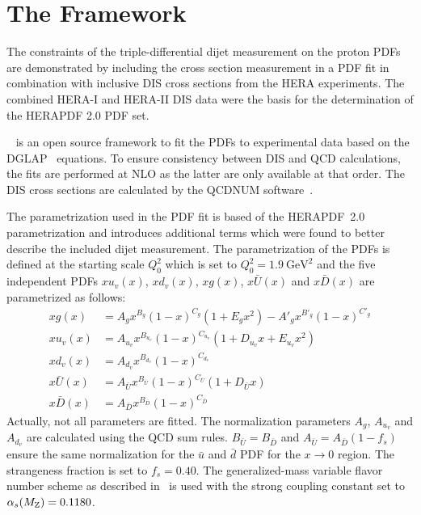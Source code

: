 \section{The \xfitter Framework}
\label{section:herafittersetup}

The constraints of the triple-differential dijet measurement on the proton PDFs
are demonstrated by including the cross section measurement in a PDF fit in
combination with inclusive DIS cross sections from the HERA experiments. The
combined HERA-I and HERA-II DIS data were the
basis for the determination of the HERAPDF 2.0 PDF set.

\xfitter~\cite{Alekhin:2014irh} is an open source framework to fit the PDFs to experimental data based
on the DGLAP~\cite{Gribov:1972ri,Altarelli:1977zs,Dokshitzer:1977sg} equations.
To ensure consistency between DIS and QCD calculations, the fits are performed
at NLO as the latter are only available at that order. The DIS cross sections
are calculated by the QCDNUM software~\cite{Botje:2010ay}.

The parametrization used in the PDF fit is based of the
HERAPDF~2.0~\cite{Abramowicz:2015mha} parametrization and introduces additional
terms which were found to better describe the included dijet
measurement. The parametrization of the PDFs is defined at the starting scale
$Q_0^2$
which is set to $Q_0^2 = \SI{1.9}{\GeV \squared}$ and the five independent PDFs
$xu_v(x)$, $xd_v(x)$, $xg(x)$, $x\bar{U}(x)$ and $x\bar{D}(x)$ are parametrized
as follows:
%
\begin{align*}
  xg(x) &= A_g x^{B_g} (1-x)^{C_g} (1 + E_g x^2) - A'_g x^{B'_g} (1-x)^{C'_g} \\
  xu_v(x) &= A_{u_{v}} x^{B_{u_{v}}} (1-x)^{C_{u_{v}}}(1 + D_{u_{v}}x + E_{u_{v}}x^2)\\
  xd_v(x) &= A_{d_v} x^{B_{d_v}} (1-x)^{C_{d_{v}}}\\
  x\bar U(x) &= A_{\bar U} x^{B_{\bar U}} (1-x)^{C_{\bar U}}(1 + D_{\bar U}x)\\
  x\bar D(x) &= A_{\bar D} x^{B_{\bar D}} (1-x)^{C_{\bar D}}
\end{align*}
%
Actually, not all parameters are fitted. The normalization parameters $A_g$,
$A_{u_{v}}$ and $A_{d_{v}}$ are calculated using the QCD sum rules. $B_{\bar
U}=B_{\bar D}$ and $A_{\bar U} = A_{\bar D}(1-f_s)$ ensure the same
normalization for the $\bar u$ and $\bar d$ PDF for the $x \rightarrow 0$
region. The strangeness fraction is set to $f_s = 0.40$. The generalized-mass
variable flavor number scheme as described in~\cite{Thorne:1997ga,Thorne:2006qt}
is used with the strong coupling constant set to $\alpha_{s}(M_\mathrm{Z})= 0.1180$.



